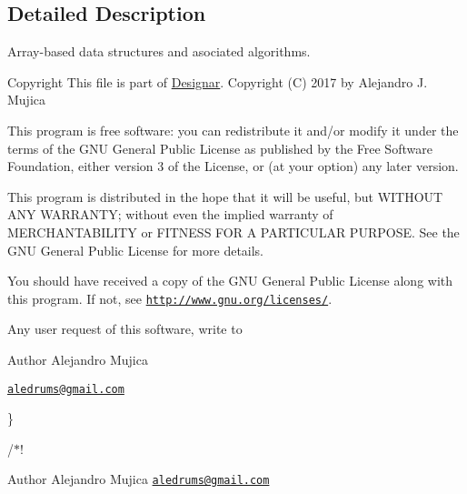 \subsection{Detailed Description}
Array-\/based data structures and asociated algorithms. 

\begin{DoxyCopyright}{Copyright}
This file is part of \hyperlink{namespace_designar}{Designar}. Copyright (C) 2017 by Alejandro J. Mujica
\end{DoxyCopyright}
This program is free software\+: you can redistribute it and/or modify it under the terms of the G\+NU General Public License as published by the Free Software Foundation, either version 3 of the License, or (at your option) any later version.

This program is distributed in the hope that it will be useful, but W\+I\+T\+H\+O\+UT A\+NY W\+A\+R\+R\+A\+N\+TY; without even the implied warranty of M\+E\+R\+C\+H\+A\+N\+T\+A\+B\+I\+L\+I\+TY or F\+I\+T\+N\+E\+SS F\+OR A P\+A\+R\+T\+I\+C\+U\+L\+AR P\+U\+R\+P\+O\+SE. See the G\+NU General Public License for more details.

You should have received a copy of the G\+NU General Public License along with this program. If not, see \href{http://www.gnu.org/licenses/}{\tt http\+://www.\+gnu.\+org/licenses/}.

Any user request of this software, write to

\begin{DoxyAuthor}{Author}
Alejandro Mujica
\end{DoxyAuthor}
\href{mailto:aledrums@gmail.com}{\tt aledrums@gmail.\+com}

\}

/$\ast$!

\begin{DoxyAuthor}{Author}
Alejandro Mujica \href{mailto:aledrums@gmail.com}{\tt aledrums@gmail.\+com} 
\end{DoxyAuthor}
